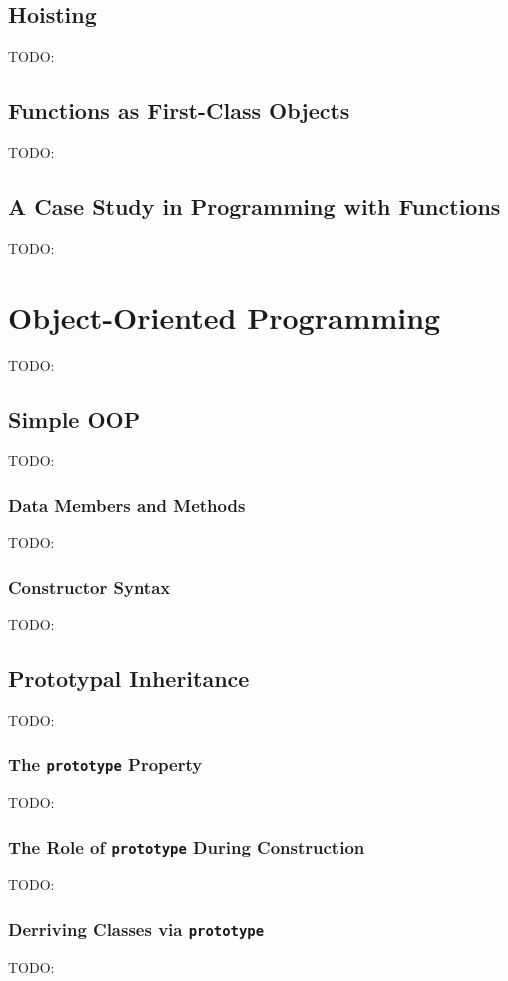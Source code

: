 \documentclass[11pt,letter]{book}
\begin{document}
    \section{Hoisting}
    TODO:
    
    \section{Functions as First-Class Objects}
    TODO:
    
    \section{A Case Study in Programming with Functions}
    TODO:
    
    \chapter{Object-Oriented Programming}
    TODO:
    
    \section{Simple OOP}
    TODO:
    
    \subsection{Data Members and Methods}
    TODO:
    
    \subsection{Constructor Syntax}
    TODO:
    
    \section{Prototypal Inheritance}
    TODO:
    
    \subsection{The \texttt{prototype} Property}
    TODO:
    
    \subsection{The Role of \texttt{prototype} During Construction}
    TODO:
    
    \subsection{Derriving Classes via \texttt{prototype}}
    TODO:
    
\end{document}
